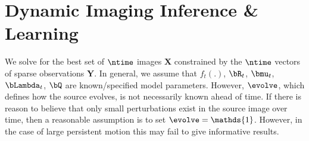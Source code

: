 







\section{Dynamic Imaging Inference \& Learning}
\label{sec:dynamic_inference}




We solve for the best set of $\ntime$ images $ \bm{X} $ constrained by the $\ntime$ vectors of sparse observations $\bm{Y}$. In general, we assume that $f_t(.)$, $\bR_t$, $\bmu_t$, $\bLambda_t$, $\bQ$ are known/specified model parameters. However, $\evolve$, which defines how the source evolves, is not necessarily known ahead of time. If there is reason to believe that only small perturbations exist in the source image over time, then a reasonable assumption is to set $\evolve = \mathds{1}$. However, in the case of large persistent motion this may fail to give informative results. 

